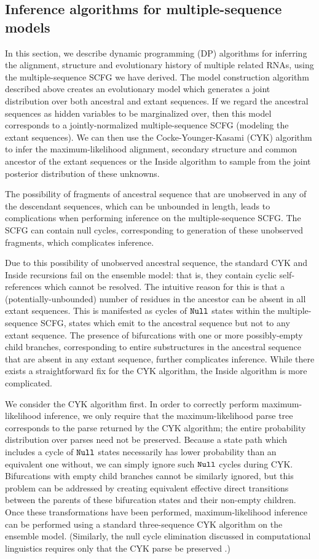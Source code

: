 \documentclass[10pt]{article}
\begin{document}
\subsection*{Inference algorithms for multiple-sequence models}

In this section, we describe dynamic programming (DP) algorithms for
inferring the alignment, structure and evolutionary history
of multiple related RNAs, using the multiple-sequence SCFG we have derived.
The model construction algorithm described above creates an evolutionary model
which generates a joint distribution over both ancestral and extant
sequences.  If we regard the ancestral sequences as hidden variables
to be marginalized over, then this model corresponds to a
jointly-normalized multiple-sequence SCFG (modeling the extant sequences).
We can then use the Cocke-Younger-Kasami (CYK) algorithm to infer the
maximum-likelihood alignment, secondary structure and common ancestor
of the extant sequences or the Inside algorithm to sample from
the joint posterior distribution of these unknowns.

The possibility of fragments of ancestral sequence that are unobserved
in any of the descendant sequences, which can be unbounded in length,
leads to complications when performing inference on the multiple-sequence
SCFG. The SCFG can contain null cycles, corresponding to generation of
these unobserved fragments, which complicates inference.

Due to this possibility of unobserved ancestral sequence,
the standard CYK and Inside recursions fail on the ensemble model:
that is, they contain cyclic self-references which cannot be resolved.
The intuitive reason for this is that a (potentially-unbounded) number of residues in the ancestor can be
absent in all extant sequences.
This is manifested as cycles of $\mathtt{Null}$ states within the multiple-sequence SCFG,
states which emit to the ancestral sequence but not to any extant sequence.
The presence of bifurcations with one or more possibly-empty child branches,
corresponding to entire substructures in the ancestral sequence that
are absent in any extant sequence, further complicates inference.
While there exists a straightforward fix for the CYK algorithm, the Inside algorithm is more complicated.

We consider the CYK algorithm first.
In order to correctly perform maximum-likelihood inference, we only
require that the maximum-likelihood parse tree corresponds to the parse
returned by the CYK algorithm; the entire
probability distribution over parses need not be preserved.
Because a state path which includes a cycle of $\mathtt{Null}$ states
necessarily has lower probability than an equivalent one without, we
can simply ignore such $\mathtt{Null}$ cycles during CYK.
Bifurcations with empty child branches cannot be similarly ignored,
but this problem can be addressed by creating equivalent effective
direct transitions between the parents of these bifurcation states and
their non-empty children.  Once these transformations have been performed,
maximum-likelihood inference can be performed using a standard
three-sequence CYK algorithm on the ensemble model.
(Similarly, the null cycle elimination discussed in computational
linguistics requires only that the CYK parse be preserved \cite{GecsegSteinby97}.)
\end{document}
